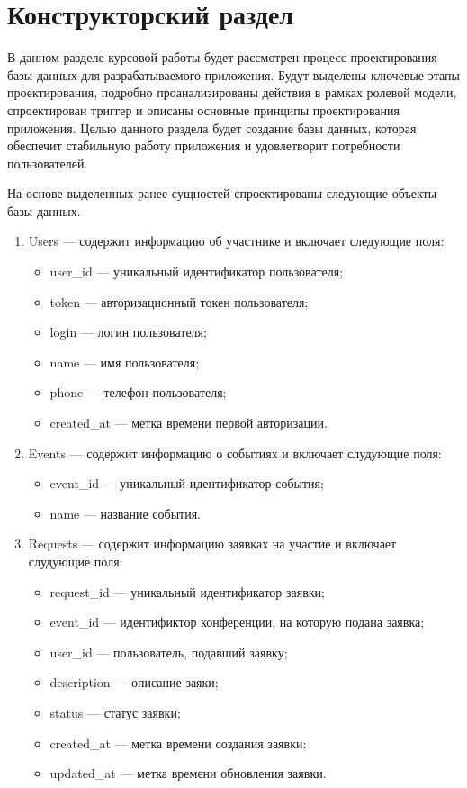  \section{Конструкторский раздел} \label{desing}

В данном разделе курсовой работы будет рассмотрен процесс проектирования базы данных для разрабатываемого приложения. Будут выделены ключевые этапы проектирования, подробно проанализированы действия в рамках ролевой модели, спроектирован триггер и описаны основные принципы проектирования приложения. Целью данного раздела будет создание базы данных, которая обеспечит стабильную работу приложения и удовлетворит потребности пользователей.


На основе выделенных ранее сущностей спроектированы следующие объекты базы данных.
\begin{enumerate}	
	\item Users --- содержит информацию об участнике и включает следующие поля:
	\begin{itemize}[label=---]
		\item user{\_}id --- уникальный идентификатор пользователя;
		\item token --- авторизационный токен пользователя;
		\item login --- логин пользователя;
		\item name --- имя пользователя;
		\item phone --- телефон пользователя;
		\item created{\_}at ---  метка времени первой авторизации.
	\end{itemize}
	
	\item Events --- содержит информацию о событиях и включает слудующие поля:
	\begin{itemize}[label=---]
		\item event{\_}id --- уникальный идентификатор события;
		\item name --- название события.
	\end{itemize}
	
	\item Requests --- содержит информацию заявках на участие и включает слудующие поля:
	\begin{itemize}[label=---]
		\item request{\_}id --- уникальный идентификатор заявки;
		\item event{\_}id --- идентификтор конференции, на которую подана заявка;
		\item user{\_}id --- пользователь, подавший заявку;
		\item description --- описание заяки;
		\item status --- статус заявки;
		\item created{\_}at --- метка времени создания заявки;
		\item updated{\_}at --- метка времени обновления заявки.
	\end{itemize}	
	

\end{enumerate}
